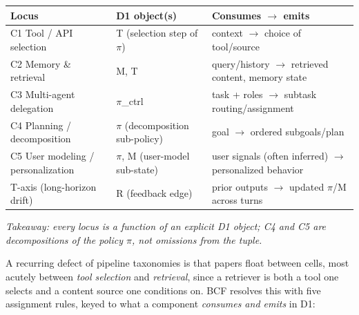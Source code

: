 \documentclass[10pt]{article}
\begin{document}
\begin{center}\footnotesize
\begin{longtable}{|p{}|p{}|p{}|}
\hline \textbf{Locus} & \textbf{D1 object(s)} & \textbf{Consumes $\rightarrow$ emits} \\ \hline\endhead
C1 Tool / API selection & T (selection step of $\pi$) & context $\rightarrow$ choice of tool/source \\ \hline
C2 Memory \& retrieval & M, T & query/history $\rightarrow$ retrieved content, memory state \\ \hline
C3 Multi-agent delegation & $\pi$\_ctrl & task + roles $\rightarrow$ subtask routing/assignment \\ \hline
C4 Planning / decomposition & $\pi$ (decomposition sub-policy) & goal $\rightarrow$ ordered subgoals/plan \\ \hline
C5 User modeling / personalization & $\pi$, M (user-model sub-state) & user signals (often inferred) $\rightarrow$ personalized behavior \\ \hline
T-axis (long-horizon drift) & R (feedback edge) & prior outputs $\rightarrow$ updated $\pi$/M across turns \\ \hline
\end{longtable}\end{center}

\emph{Takeaway: every locus is a function of an explicit D1 object; C4 and C5 are decompositions of the policy $\pi$, not omissions from the tuple.}

A recurring defect of pipeline taxonomies is that papers float between cells, most acutely between \emph{tool selection} and \emph{retrieval}, since a retriever is both a tool one selects and a content source one conditions on. BCF resolves this with five assignment rules, keyed to what a component \emph{consumes and emits} in D1:
\end{document}
